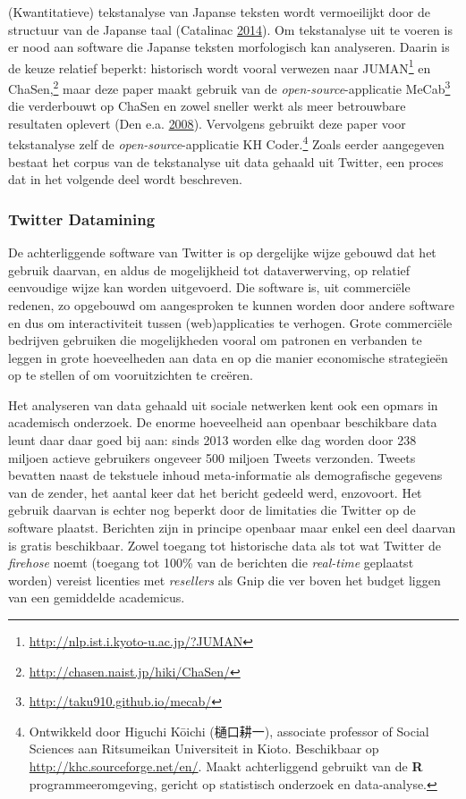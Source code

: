 \documentclass[10.5pt,dutch,]{article}
\begin{document}
(Kwantitatieve) tekstanalyse van Japanse teksten wordt vermoeilijkt door
de structuur van de Japanse taal (Catalinac
\protect\hyperlink{ref-catalinacux5fquantitativeux5f2014}{2014}). Om
tekstanalyse uit te voeren is er nood aan software die Japanse teksten
morfologisch kan analyseren. Daarin is de keuze relatief beperkt:
historisch wordt vooral verwezen naar JUMAN\footnote{\url{http://nlp.ist.i.kyoto-u.ac.jp/?JUMAN}}
en ChaSen,\footnote{\url{http://chasen.naist.jp/hiki/ChaSen/}} maar deze
paper maakt gebruik van de \emph{open-source}-applicatie MeCab\footnote{\url{http://taku910.github.io/mecab/}}
die verderbouwt op ChaSen en zowel sneller werkt als meer betrouwbare
resultaten oplevert (Den e.a.
\protect\hyperlink{ref-denux5fproperux5f2008}{2008}). Vervolgens
gebruikt deze paper voor tekstanalyse zelf de
\emph{open-source}-applicatie KH Coder.\footnote{Ontwikkeld door Higuchi
  Kōichi (樋口耕一), associate professor of Social Sciences aan
  Ritsumeikan Universiteit in Kioto. Beschikbaar op
  \url{http://khc.sourceforge.net/en/}. Maakt achterliggend gebruikt van
  de \textbf{R} programmeeromgeving, gericht op statistisch onderzoek en
  data-analyse.} Zoals eerder aangegeven bestaat het corpus van de
tekstanalyse uit data gehaald uit Twitter, een proces dat in het
volgende deel wordt beschreven.

\subsubsection{Twitter Datamining}\label{twitter-datamining}

De achterliggende software van Twitter is op dergelijke wijze gebouwd
dat het gebruik daarvan, en aldus de mogelijkheid tot dataverwerving, op
relatief eenvoudige wijze kan worden uitgevoerd. Die software is, uit
commerciële redenen, zo opgebouwd om aangesproken te kunnen worden door
andere software en dus om interactiviteit tussen (web)applicaties te
verhogen. Grote commerciële bedrijven gebruiken die mogelijkheden vooral
om patronen en verbanden te leggen in grote hoeveelheden aan data en op
die manier economische strategieën op te stellen of om vooruitzichten te
creëren.

Het analyseren van data gehaald uit sociale netwerken kent ook een
opmars in academisch onderzoek. De enorme hoeveelheid aan openbaar
beschikbare data leunt daar daar goed bij aan: sinds 2013 worden elke
dag worden door 238 miljoen actieve gebruikers ongeveer 500 miljoen
Tweets verzonden. Tweets bevatten naast de tekstuele inhoud
meta-informatie als demografische gegevens van de zender, het aantal
keer dat het bericht gedeeld werd, enzovoort. Het gebruik daarvan is
echter nog beperkt door de limitaties die Twitter op de software
plaatst. Berichten zijn in principe openbaar maar enkel een deel daarvan
is gratis beschikbaar. Zowel toegang tot historische data als tot wat
Twitter de \emph{firehose} noemt (toegang tot 100\% van de berichten die
\emph{real-time} geplaatst worden) vereist licenties met
\emph{resellers} als Gnip die ver boven het budget liggen van een
gemiddelde academicus.
\end{document}
